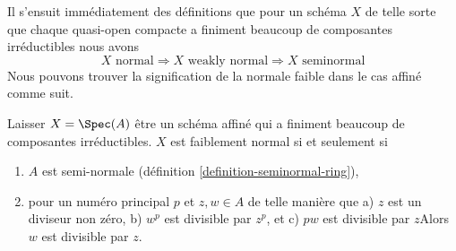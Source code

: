 \noindent
Il s'ensuit immédiatement des définitions que pour un schéma $X$ de telle sorte que chaque quasi-open compacte a finiment beaucoup de composantes irréductibles nous avons $$
X\text{ normal} \Rightarrow
X\text{ weakly normal} \Rightarrow
X\text{ seminormal}
$$ Nous pouvons trouver la signification de la normale faible dans le cas affiné comme suit.

\begin{lemma}

\label{lemma-affine-weakly-normal}

Laisser $X = \Spec(A)$ être un schéma affiné qui a finiment beaucoup de composantes irréductibles. $X$ est faiblement normal si et seulement si

\begin{enumerate}

\item  $A$ est semi-normale (définition \ref{definition-seminormal-ring}),
\item pour un numéro principal $p$ et $z, w \in A$ de telle manière que a) $z$ est un diviseur non zéro, b) $w^p$ est divisible par $z^p$, et c) $pw$ est divisible par $z$Alors $w$ est divisible par $z$.

\end{enumerate}

\end{lemma}

